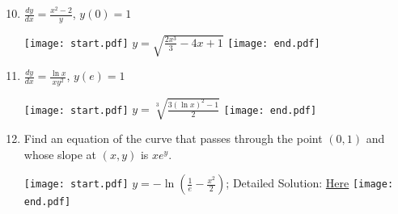 \documentclass[12pt]{article}
\begin{document}
\begin{enumerate}
\setcounter{enumi}{9}

\item $\frac{dy}{dx}=\frac{x^2-2}{y}$, $y(0)=1$

\texttt{[image: start.pdf]}
{{$y=\sqrt{\frac{2x^3}{3}-4x+1}$}}
\texttt{[image: end.pdf]}


\item $\frac{dy}{dx}=\frac{\ln{x}}{xy^2}$, $y(e)=1$

\texttt{[image: start.pdf]}
{{$y=\sqrt[3]{\frac{3(\ln{x})^2-1}{2}}$}}
\texttt{[image: end.pdf]}


\item Find an equation of the curve that passes through the point $(0,1)$ and whose slope at $(x,y)$ is $xe^y$.

\texttt{[image: start.pdf]}
{{$y = -\ln{\left(\frac{1}{e}-\frac{x^2}{2}\right)}$; Detailed Solution: \textcolor{blue}{\href{http://www.math.drexel.edu/classes/Calculus/resources/Math123HW/Solutions/123_01_Separable_12.pdf}{Here}}}}
\texttt{[image: end.pdf]}


\end{enumerate}
\end{document}
